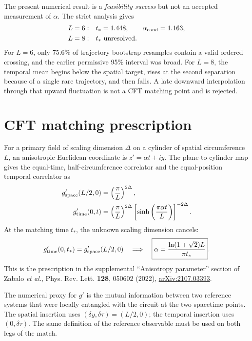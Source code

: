 \documentclass[10pt]{article}
\begin{document}
The present numerical result is a \emph{feasibility success} but not an accepted
measurement of $\alpha$.  The strict analysis gives
\begin{align*}
L=6:&\quad t_*=1.448,\qquad \alpha_{\rm cand}=1.163,
\\
L=8:&\quad t_*\text{ unresolved}.
\end{align*}
For $L=6$, only $75.6\%$ of trajectory-bootstrap resamples contain a valid
ordered crossing, and the earlier permissive 95\% interval was broad.  For
$L=8$, the temporal mean begins below the spatial target, rises at the second
separation because of a single rare trajectory, and then falls.  A late
downward interpolation through that upward fluctuation is not a CFT matching
point and is rejected.

\section{CFT matching prescription}

For a primary field of scaling dimension $\Delta$ on a cylinder of spatial
circumference $L$, an anisotropic Euclidean coordinate is
$z'=\alpha t+iy$.  The plane-to-cylinder map gives the equal-time,
half-circumference correlator and the equal-position temporal correlator as
\begin{align}
g_{\rm space}'(L/2,0)
  &=\left(\frac{\pi}{L}\right)^{2\Delta},
\\
g_{\rm time}'(0,t)
  &=\left(\frac{\pi}{L}\right)^{2\Delta}
    \left[\sinh\left(\frac{\pi\alpha t}{L}\right)\right]^{-2\Delta}.
\end{align}
At the matching time $t_*$, the unknown scaling dimension cancels:
\begin{equation}
g_{\rm time}'(0,t_*)=g_{\rm space}'(L/2,0)
\quad\Longrightarrow\quad
\boxed{\alpha=\frac{\ln(1+\sqrt 2)L}{\pi t_*}}.
\label{eq:alpha}
\end{equation}
This is the prescription in the supplemental ``Anisotropy parameter'' section
of Zabalo \emph{et al.}, Phys. Rev. Lett. \textbf{128}, 050602 (2022),
\href{https://arxiv.org/abs/2107.03393}{arXiv:2107.03393}.

The numerical proxy for $g'$ is the mutual information between two reference
systems that were locally entangled with the circuit at the two spacetime
points.  The spatial insertion uses $(\delta y,\delta\tau)=(L/2,0)$; the
temporal insertion uses $(0,\delta\tau)$.  The same definition of the reference
observable must be used on both legs of the match.
\end{document}
